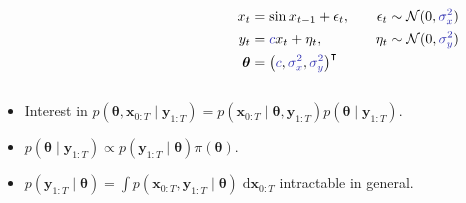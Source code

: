 \documentclass{beamer}
\newcommand{\bx}{\bm{x}}
\newcommand{\by}{\bm{y}}
\newcommand{\btheta}{\bm{\theta}}
\newcommand{\dx}[1]{\mathrm{d}{#1}}
\begin{document}
\begin{frame}
\begin{columns}
\begin{column}{0.5\textwidth}
\begin{figure}[ht]
{
                }
                \label{fig:graphical-model2}
            \end{figure}                
        \end{column}
        \begin{column}{0.5\textwidth}
            \begin{alignat*}{2}
            x_t & = \sin x_{t-1} + \epsilon_t, \quad & \epsilon_t \sim \mathcal{N}(0, \textcolor[RGB]{51,51,178}{\sigma_x^2}) \\
            y_t & = \textcolor[RGB]{51,51,178}{c} x_t + \eta_t, \quad & \eta_t \sim \mathcal{N}(0, \textcolor[RGB]{51,51,178}{\sigma_y^2}) \\
            \btheta & = \left(\textcolor[RGB]{51,51,178}{c}, \textcolor[RGB]{51,51,178}{\sigma_x^2}, \textcolor[RGB]{51,51,178}{\sigma_y^2}\right)^\intercal &
            \end{alignat*}
        \end{column}
    \end{columns}
    
    \begin{itemize}
        \item Interest in $p(\btheta, \bx_{0:T} \mid \by_{1:T}) = p(\bx_{0:T} \mid \btheta, \by_{1:T}) p(\btheta \mid \by_{1:T})$.
        \item $p(\btheta \mid \by_{1:T}) \propto p(\by_{1:T} \mid \btheta) \pi(\btheta)$.
        \item $p(\by_{1:T} \mid \btheta) = \int p(\bx_{0:T}, \by_{1:T} \mid \btheta) \; \dx{\bx_{0:T}}$ intractable in general.
    \end{itemize}
    \end{frame}
\end{document}
